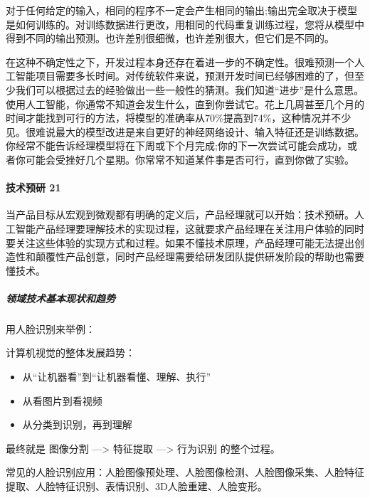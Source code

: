 \documentclass[letterpaper,11pt,english]{sphinxmanual}
\begin{document}
对于任何给定的输入，相同的程序不一定会产生相同的输出;输出完全取决于模型是如何训练的。对训练数据进行更改，用相同的代码重复训练过程，您将从模型中得到不同的输出预测。也许差别很细微，也许差别很大，但它们是不同的。

在这种不确定性之下，开发过程本身还存在着进一步的不确定性。很难预测一个人工智能项目需要多长时间。对传统软件来说，预测开发时间已经够困难的了，但至少我们可以根据过去的经验做出一些一般性的猜测。我们知道“进步”是什么意思。使用人工智能，你通常不知道会发生什么，直到你尝试它。花上几周甚至几个月的时间才能找到可行的方法，将模型的准确率从70\%提高到74\%，这种情况并不少见。很难说最大的模型改进是来自更好的神经网络设计、输入特征还是训练数据。你经常不能告诉经理模型将在下周或下个月完成;你的下一次尝试可能会成功，或者你可能会受挫好几个星期。你常常不知道某件事是否可行，直到你做了实验。


\paragraph{技术预研 21\sphinxfootnotemark[378]}
\label{\detokenize{chapter_idea/understand_tech:id33}}%
\begin{footnotetext}[378]\sphinxAtStartFootnote
{}
%
\end{footnotetext}\ignorespaces 
当产品目标从宏观到微观都有明确的定义后，产品经理就可以开始：技术预研。人工智能产品经理要理解技术的实现过程，这就要求产品经理在关注用户体验的同时要关注这些体验的实现方式和过程。如果不懂技术原理，产品经理可能无法提出创造性和颠覆性产品创意，同时产品经理需要给研发团队提供研发阶段的帮助也需要懂技术。


\subparagraph{领域技术基本现状和趋势}
\label{\detokenize{chapter_idea/understand_tech:id34}}
用人脸识别来举例：

计算机视觉的整体发展趋势：
\begin{itemize}
\item {} 
从“让机器看”到“让机器看懂、理解、执行”

\item {} 
从看图片到看视频

\item {} 
从分类到识别，再到理解

\end{itemize}

最终就是 图像分割 —\sphinxhyphen{}> 特征提取 —\sphinxhyphen{}> 行为识别 的整个过程。

常见的人脸识别应用：人脸图像预处理、人脸图像检测、人脸图像采集、人脸特征提取、人脸特征识别、表情识别、3D人脸重建、人脸变形。
\end{document}
